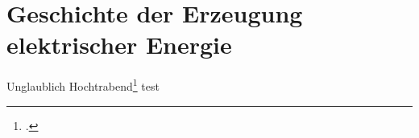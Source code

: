 \section{Geschichte der Erzeugung elektrischer Energie}
Unglaublich Hochtrabend\footcite[159]{Watts1993}
test